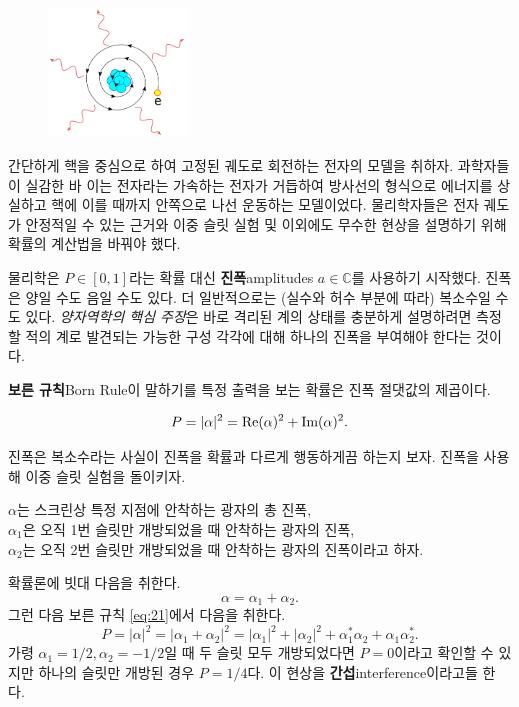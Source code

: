 \documentclass[a4paper,chapter,atbegshi,hidelinks]{oblivoir}
\begin{document}
\begin{figure}
    \centering
    \includegraphics[width=0.33\textwidth]{iqis1_008}
\end{figure}

간단하게 핵을 중심으로 하여 고정된 궤도로 회전하는 전자의 모델을 취하자.
과학자들이 실감한 바 이는 전자라는 가속하는 전자가 거듭하여 방사선의
형식으로 에너지를 상실하고 핵에 이를 때까지 안쪽으로 나선 운동하는 모델이었다.
물리학자들은 전자 궤도가 안정적일 수 있는 근거와 이중 슬릿 실험 및 이외에도
무수한 현상을 설명하기 위해 확률의 계산법을 바꿔야 했다. 

물리학은 $P\in[0,1]$라는 확률 대신 \textbf{진폭}{\footnotesize amplitudes}
$a\in\mathbb{C}$를 사용하기 시작했다. 진폭은 양일 수도 음일 수도 있다. 더
일반적으로는 (실수와 허수 부분에 따라) 복소수일 수도 있다. \emph{양자역학의
핵심 주장}은 바로 격리된 계의 상태를 충분하게 설명하려면 측정할 적의 계로
발견되는 가능한 구성 각각에 대해 하나의 진폭을 부여해야 한다는 것이다.

\textbf{보른 규칙}{\footnotesize Born Rule}이 말하기를 특정 출력을 보는 확률은
진폭 절댓값의 제곱이다.

\begin{equation}{\label{eq:21}}
  P = |\alpha|^2=\textrm{Re}(\alpha)^2+\textrm{Im}(\alpha)^2.
\end{equation}

진폭은 복소수라는 사실이 진폭을 확률과 다르게 행동하게끔 하는지 보자. 진폭을
사용해 이중 슬릿 실험을 돌이키자.

\hfill
\hfill\parbox[t]{12cm}{
  $\alpha$는 스크린상 특정 지점에 안착하는 광자의 총 진폭,\\
  $\alpha_1$은 오직 1번 슬릿만 개방되었을 때 안착하는 광자의 진폭,\\
  $\alpha_2$는 오직 2번 슬릿만 개방되었을 때 안착하는 광자의 진폭이라고 하자.
}

\hfill\break
확률론에 빗대 다음을 취한다.
\begin{equation}
  \alpha = \alpha_1+\alpha_2.
\end{equation}
그런 다음 보른 규칙 \ref{eq:21}에서 다음을 취한다.
\begin{equation}
  P = |\alpha|^2=|\alpha_1+\alpha_2|^2=|\alpha_1|^2+|\alpha_2|^2+
  \alpha_1^*\alpha_2+\alpha_1\alpha_2^*.
\end{equation}
가령 $\alpha_1=1/2, \alpha_2=-1/2$일 때 두 슬릿 모두 개방되었다면 $P=0$이라고
확인할 수 있지만 하나의 슬릿만 개방된 경우 $P=1/4$다. 이 현상을
\textbf{간섭}{\footnotesize interference}이라고들 한다.
\end{document}
